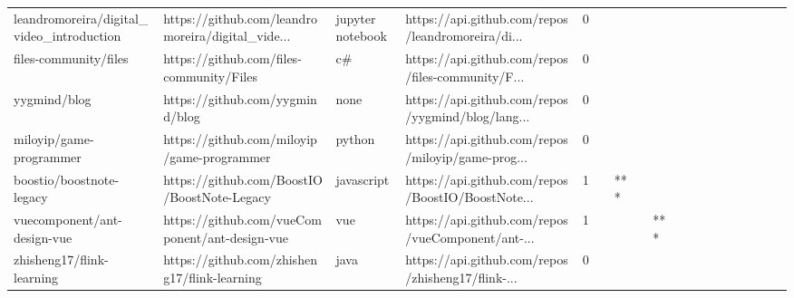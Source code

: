 \begin{tabular}{llllrlllllllllllll}
leandromoreira/digital\_video\_introduction          &  https://github.com/leandromoreira/digital\_vide... &  jupyter notebook &  https://api.github.com/repos/leandromoreira/di... &       0 &         &        &           &                &                 &        &           &           &          &          &       &              &          \\
files-community/files                              &           https://github.com/files-community/Files &                c\# &  https://api.github.com/repos/files-community/F... &       0 &         &        &           &                &                 &        &           &           &          &          &       &              &          \\
yygmind/blog                                       &                    https://github.com/yygmind/blog &              none &  https://api.github.com/repos/yygmind/blog/lang... &       0 &         &        &           &                &                 &        &           &           &          &          &       &              &          \\
miloyip/game-programmer                            &         https://github.com/miloyip/game-programmer &            python &  https://api.github.com/repos/miloyip/game-prog... &       0 &         &        &           &                &                 &        &           &           &          &          &       &              &          \\
boostio/boostnote-legacy                           &        https://github.com/BoostIO/BoostNote-Legacy &        javascript &  https://api.github.com/repos/BoostIO/BoostNote... &       1 &         &    *** &           &                &                 &        &           &           &          &          &       &              &          \\
vuecomponent/ant-design-vue                        &     https://github.com/vueComponent/ant-design-vue &               vue &  https://api.github.com/repos/vueComponent/ant-... &       1 &         &        &           &            *** &                 &        &           &           &          &          &       &              &          \\
zhisheng17/flink-learning                          &       https://github.com/zhisheng17/flink-learning &              java &  https://api.github.com/repos/zhisheng17/flink-... &       0 &         &        &           &                &                 &        &           &           &          &          &       &              &          \\

\end{tabular}
